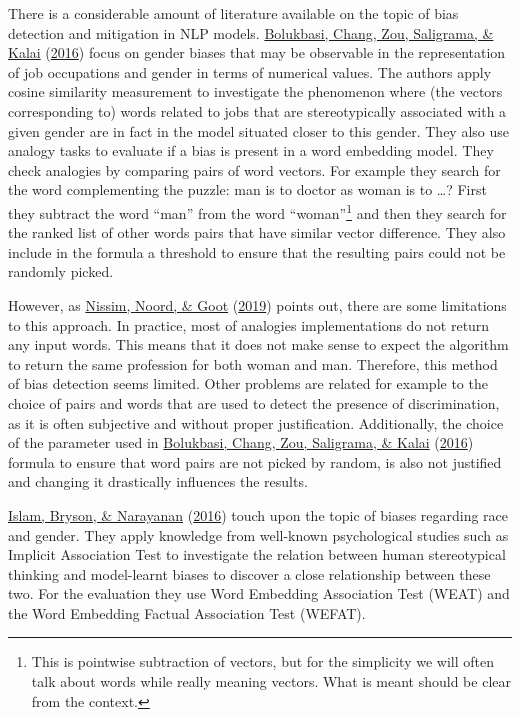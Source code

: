 \documentclass[
  12pt,
]{book}
\begin{document}
There is a considerable amount of literature available on the topic of bias detection and mitigation in NLP models. \protect\hyperlink{ref-Bolukbasi2016Man}{Bolukbasi, Chang, Zou, Saligrama, \& Kalai} (\protect\hyperlink{ref-Bolukbasi2016Man}{2016}) focus on gender biases that may be observable in the representation of job occupations and gender in terms of numerical
values. The authors apply cosine similarity measurement to investigate the phenomenon where (the vectors corresponding to) words related to jobs that are stereotypically associated with a given gender are in fact in the model situated closer to this gender.
They also use analogy tasks to evaluate if a bias is present in a word embedding model. They check analogies by comparing pairs of word vectors. For example they search for the word complementing the puzzle: man is to doctor as woman is to \ldots? First they subtract the word ``man'' from the word ``woman''\footnote{This is pointwise subtraction of vectors, but for the simplicity we will often talk about words while really meaning vectors. What is meant should be clear from the context.} and then
they search for the ranked list of other words pairs that have similar vector difference. They also include in the formula a threshold to ensure that the resulting pairs could not be randomly picked.

However, as \protect\hyperlink{ref-Nissim2019Fair}{Nissim, Noord, \& Goot} (\protect\hyperlink{ref-Nissim2019Fair}{2019}) points out, there are some limitations to this approach. In practice, most of analogies implementations do not return any input words. This means that it does not make sense to expect the algorithm to return the same profession for both woman and man. Therefore, this method of bias detection seems limited. Other problems are related for example to the choice of pairs and words that are used to detect the presence of discrimination, as it is often subjective and without proper justification. Additionally, the choice of the parameter used in \protect\hyperlink{ref-Bolukbasi2016Man}{Bolukbasi, Chang, Zou, Saligrama, \& Kalai} (\protect\hyperlink{ref-Bolukbasi2016Man}{2016}) formula to ensure that word pairs are not picked by random, is also not justified and changing it drastically
influences the results.

\protect\hyperlink{ref-Caliskan2017Semantics}{Islam, Bryson, \& Narayanan} (\protect\hyperlink{ref-Caliskan2017Semantics}{2016}) touch upon the topic of biases regarding race and gender. They apply knowledge from well-known psychological studies such as Implicit Association Test to investigate the relation between human stereotypical thinking and model-learnt biases to discover a close relationship between these two. For the evaluation they use Word Embedding Association Test (WEAT) and the Word Embedding Factual Association Test (WEFAT).
\end{document}
